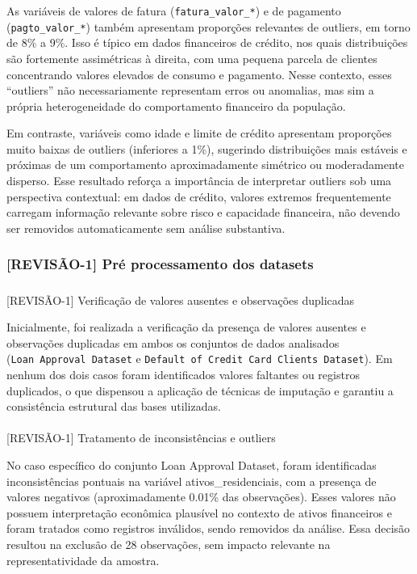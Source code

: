 \documentclass[
  brazilian,
  12pt,
  letterpaper,
  DIV=11,
  numbers=noendperiod]{scrartcl}
\makeatletter
\let\oldparagraph\paragraph
\renewcommand{\paragraph}{
    \@ifstar
      \xxxParagraphStar
      \xxxParagraphNoStar
  }
\newcommand{\xxxParagraphStar}[1]{\oldparagraph*{#1}\mbox{}}
\newcommand{\xxxParagraphNoStar}[1]{\oldparagraph{#1}\mbox{}}
\let\oldsubparagraph\subparagraph
\renewcommand{\subparagraph}{
    \@ifstar
      \xxxSubParagraphStar
      \xxxSubParagraphNoStar
  }
\newcommand{\xxxSubParagraphStar}[1]{\oldsubparagraph*{#1}\mbox{}}
\newcommand{\xxxSubParagraphNoStar}[1]{\oldsubparagraph{#1}\mbox{}}
\makeatother
\begin{document}
As variáveis de valores de fatura (\texttt{fatura\_valor\_*}) e de
pagamento (\texttt{pagto\_valor\_*}) também apresentam proporções
relevantes de outliers, em torno de 8\% a 9\%. Isso é típico em dados
financeiros de crédito, nos quais distribuições são fortemente
assimétricas à direita, com uma pequena parcela de clientes concentrando
valores elevados de consumo e pagamento. Nesse contexto, esses
``outliers'' não necessariamente representam erros ou anomalias, mas sim
a própria heterogeneidade do comportamento financeiro da população.

Em contraste, variáveis como idade e limite de crédito apresentam
proporções muito baixas de outliers (inferiores a 1\%), sugerindo
distribuições mais estáveis e próximas de um comportamento
aproximadamente simétrico ou moderadamente disperso. Esse resultado
reforça a importância de interpretar outliers sob uma perspectiva
contextual: em dados de crédito, valores extremos frequentemente
carregam informação relevante sobre risco e capacidade financeira, não
devendo ser removidos automaticamente sem análise substantiva.

\subsubsection{{[}REVISÃO-1{]} Pré processamento dos
datasets}\label{revisuxe3o-1-pruxe9-processamento-dos-datasets}

\subparagraph{{[}REVISÃO-1{]} Verificação de valores ausentes e
observações
duplicadas}\label{revisuxe3o-1-verificauxe7uxe3o-de-valores-ausentes-e-observauxe7uxf5es-duplicadas}

Inicialmente, foi realizada a verificação da presença de valores
ausentes e observações duplicadas em ambos os conjuntos de dados
analisados (\texttt{Loan\ Approval\ Dataset} e
\texttt{Default\ of\ Credit\ Card\ Clients\ Dataset}). Em nenhum dos
dois casos foram identificados valores faltantes ou registros
duplicados, o que dispensou a aplicação de técnicas de imputação e
garantiu a consistência estrutural das bases utilizadas.

\paragraph{{[}REVISÃO-1{]} Tratamento de inconsistências e
outliers}\label{revisuxe3o-1-tratamento-de-inconsistuxeancias-e-outliers}

No caso específico do conjunto Loan Approval Dataset, foram
identificadas inconsistências pontuais na variável ativos\_residenciais,
com a presença de valores negativos (aproximadamente 0.01\% das
observações). Esses valores não possuem interpretação econômica
plausível no contexto de ativos financeiros e foram tratados como
registros inválidos, sendo removidos da análise. Essa decisão resultou
na exclusão de 28 observações, sem impacto relevante na
representatividade da amostra.
\end{document}
